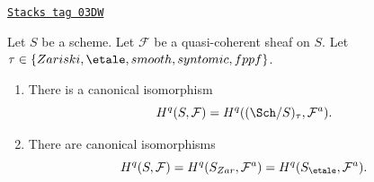 \begin{proposition}
\label{descent-proposition-same-cohomology-quasi-coherent}
\href{https://stacks.math.columbia.edu/tag/03DW}{\texttt{Stacks tag 03DW}}


Let $S$ be a scheme. Let $\mathcal{F}$ be a quasi-coherent sheaf on $S$.
Let $\tau \in \{Zariski, \linebreak[0] \etale, \linebreak[0]
smooth, \linebreak[0] syntomic, \linebreak[0] fppf\}$.
\begin{enumerate}
\item There is a canonical isomorphism
$$
H^q(S, \mathcal{F}) = H^q((\Sch/S)_\tau, \mathcal{F}^a).
$$
\item There are canonical isomorphisms
$$
H^q(S, \mathcal{F}) =
H^q(S_{Zar}, \mathcal{F}^a) =
H^q(S_\etale, \mathcal{F}^a).
$$
\end{enumerate}
\end{proposition}

